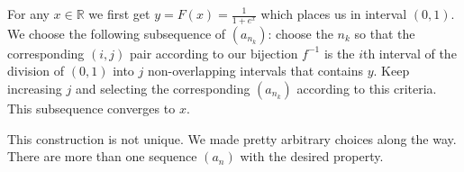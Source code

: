 \begin{solution}
For any $x \in \mathbb{R}$ we first get $y = F(x) = \frac{1}{1 + e^x}$ which places us in interval $(0, 1)$. We choose the following subsequence of $(a_{n_k})$: choose the $n_k$ so that the corresponding $(i, j)$ pair according to our bijection $f^{-1}$ is the $i$th interval of the division of $(0, 1)$ into $j$ non-overlapping intervals that contains $y$. Keep increasing $j$ and selecting the corresponding $(a_{n_k})$ according to this criteria. This subsequence converges to $x$. 

This construction is not unique. We made pretty arbitrary choices along the way. There are more than one sequence $(a_n)$ with the desired property.

\end{solution}

